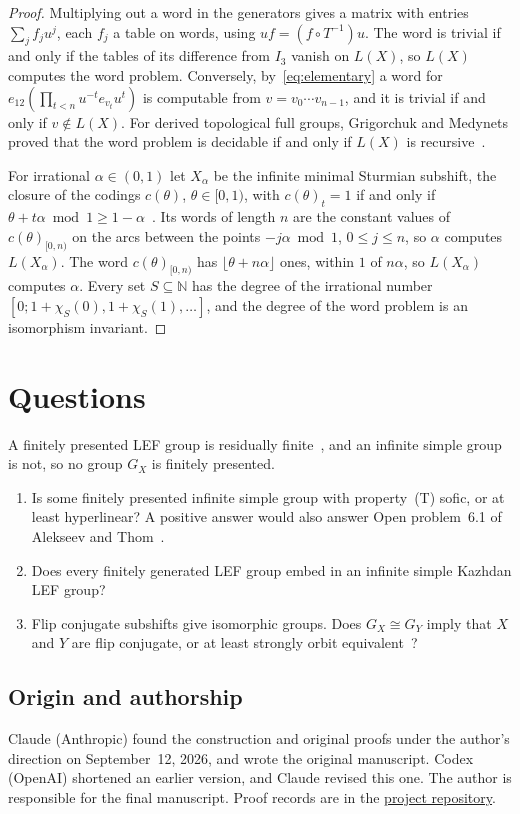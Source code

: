 \documentclass[11pt]{amsart}
\begin{document}
\begin{proof}
Multiplying out a word in the generators gives a matrix with entries
$\sum_jf_ju^j$, each $f_j$ a table on words, using $uf=(f\circ T^{-1})u$.
The word is trivial if and only if the tables of its difference from
$I_3$ vanish on $L(X)$, so $L(X)$ computes the word problem. Conversely,
by~\eqref{eq:elementary} a word for $e_{12}(\prod_{t<n}u^{-t}e_{v_t}u^t)$
is computable from $v=v_0\cdots v_{n-1}$, and it is trivial if and only
if $v\notin L(X)$. For derived topological full groups, Grigorchuk and
Medynets proved that the word problem is decidable if and only if
$L(X)$ is recursive~\cite[Theorem~1.1(3)]{GMpres}.

For irrational $\alpha\in(0,1)$ let $X_\alpha$ be the infinite minimal
Sturmian subshift, the closure of the codings $c(\theta)$,
$\theta\in[0,1)$, with $c(\theta)_t=1$ if and only if
$\theta+t\alpha\bmod1\ge1-\alpha$~\cite{MorseHedlund}. Its words of
length $n$ are the constant values of $c(\theta)_{[0,n)}$ on the arcs
between the points $-j\alpha\bmod1$, $0\le j\le n$, so $\alpha$ computes
$L(X_\alpha)$. The word $c(\theta)_{[0,n)}$ has
$\lfloor\theta+n\alpha\rfloor$ ones, within $1$ of $n\alpha$, so
$L(X_\alpha)$ computes $\alpha$. Every set $S\subseteq\mathbb N$ has the
degree of the irrational number $[0;1+\chi_S(0),1+\chi_S(1),\dots]$, and
the degree of the word problem is an isomorphism invariant.
\end{proof}

\section*{Questions}
A finitely presented LEF group is residually finite~\cite{VershikGordon},
and an infinite simple group is not, so no group $G_X$ is finitely
presented.
\begin{enumerate}
\item Is some finitely presented infinite simple group with
property~\textup{(T)} sofic, or at least hyperlinear? A positive answer
would also answer Open problem~6.1 of Alekseev and Thom~\cite{AlekseevThom}.
\item Does every finitely generated LEF group embed in an infinite simple
Kazhdan LEF group?
\item Flip conjugate subshifts give isomorphic groups. Does
$G_X\cong G_Y$ imply that $X$ and $Y$ are flip conjugate, or at least
strongly orbit equivalent~\cite{GPS}?
\end{enumerate}

\subsection*{Origin and authorship}
Claude (Anthropic) found the construction and original proofs under
the author's direction on September~12, 2026, and wrote the original
manuscript. Codex (OpenAI) shortened an earlier version, and Claude
revised this one. The author is responsible for the final manuscript.
Proof records are in the
\href{https://github.com/SauersML/group-approximation}{project repository}.
\end{document}
